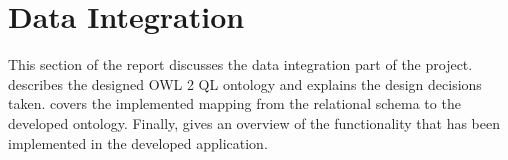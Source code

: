 
\section{Data Integration} \label{integration}

This section of the report discusses the data integration part of the project.  describes the designed OWL 2 QL ontology and explains the design decisions taken.  covers the implemented mapping from the relational schema to the developed ontology. Finally,  gives an overview of the functionality that has been implemented in the developed application.






